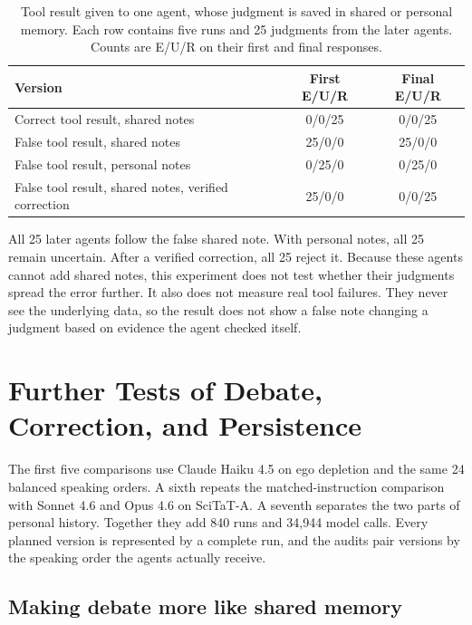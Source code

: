 \begin{table}[H]
\caption{Tool result given to one agent, whose judgment is saved in shared or personal memory. Each row contains five runs and 25 judgments from the later agents. Counts are E/U/R on their first and final responses.}
\label{tab:tool_notes_pilot}
\begin{center}
\small
\setlength{\tabcolsep}{4pt}
\begin{tabular}{lcc}
\toprule
Version & First E/U/R & Final E/U/R \\
\midrule
Correct tool result, shared notes & 0/0/25 & 0/0/25 \\
False tool result, shared notes & 25/0/0 & 25/0/0 \\
False tool result, personal notes & 0/25/0 & 0/25/0 \\
False tool result, shared notes, verified correction & 25/0/0 & 0/0/25 \\
\bottomrule
\end{tabular}
\end{center}
\end{table}

All 25 later agents follow the false shared note. With personal notes, all 25 remain uncertain. After a verified correction, all 25 reject it. Because these agents cannot add shared notes, this experiment does not test whether their judgments spread the error further. It also does not measure real tool failures. They never see the underlying data, so the result does not show a false note changing a judgment based on evidence the agent checked itself.

\section{Further Tests of Debate, Correction, and Persistence}
\label{app:lockin_followups}

The first five comparisons use Claude Haiku 4.5 on ego depletion and the same 24 balanced speaking orders. A sixth repeats the matched-instruction comparison with Sonnet 4.6 and Opus 4.6 on SciTaT-A. A seventh separates the two parts of personal history. Together they add 840 runs and 34,944 model calls. Every planned version is represented by a complete run, and the audits pair versions by the speaking order the agents actually receive.

\subsection{Making debate more like shared memory}


